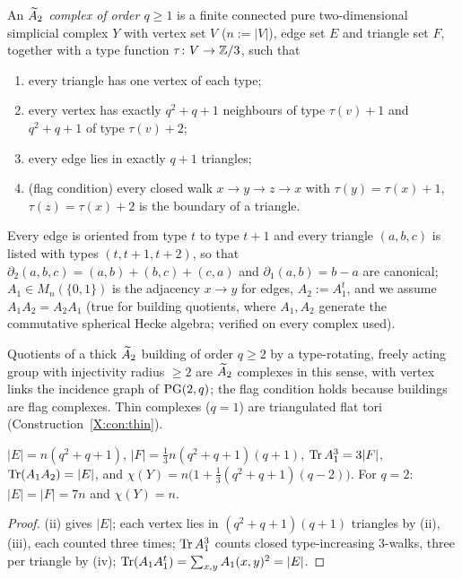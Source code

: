 \begin{definition}\label{X:def:a2}
An \emph{$\widetilde A_2$ complex of order $q\ge1$} is a finite connected pure two-dimensional
simplicial complex $Y$ with vertex set $V$ ($n:=|V|$), edge set $E$ and triangle set $F$,
together with a type function $\tau\colon V\to\mathbb{Z}/3$, such that
\begin{enumerate}
\item[(i)] every triangle has one vertex of each type;
\item[(ii)] every vertex has exactly $q^{2}+q+1$ neighbours of type $\tau(v)+1$ and
$q^{2}+q+1$ of type $\tau(v)+2$;
\item[(iii)] every edge lies in exactly $q+1$ triangles;
\item[(iv)] (flag condition) every closed walk $x\to y\to z\to x$ with
$\tau(y)=\tau(x)+1$, $\tau(z)=\tau(x)+2$ is the boundary of a triangle.
\end{enumerate}
Every edge is oriented from type $t$ to type $t+1$ and every triangle $(a,b,c)$ is listed
with types $(t,t+1,t+2)$, so that $\partial_2(a,b,c)=(a,b)+(b,c)+(c,a)$ and
$\partial_1(a,b)=b-a$ are canonical; $A_1\in M_n(\{0,1\})$ is the adjacency $x\to y$ for
edges, $A_2:=A_1^{t}$, and we assume $A_1A_2=A_2A_1$ (true for building quotients, where
$A_1,A_2$ generate the commutative spherical Hecke algebra; verified on every complex used).
\end{definition}

Quotients of a thick $\widetilde A_2$ building of order $q\ge2$ by a type-rotating, freely acting
group with injectivity radius $\ge2$ are $\widetilde A_2$ complexes in this sense, with vertex links
the incidence graph of $\mathrm{PG}(2,q)$; the flag condition holds because buildings are flag
complexes. Thin complexes ($q=1$) are triangulated flat tori (Construction~\ref{X:con:thin}).

\begin{lemma}[Counts]\label{X:lem:counts}
$|E|=n(q^{2}+q+1)$, $|F|=\tfrac13n(q^{2}+q+1)(q+1)$, $\operatorname{Tr} A_1^{3}=3|F|$,
$\operatorname{Tr}(A_1A_2)=|E|$, and $\chi(Y)=n\bigl(1+\tfrac13(q^{2}+q+1)(q-2)\bigr)$. For $q=2$:
$|E|=|F|=7n$ and $\chi(Y)=n$.
\end{lemma}

\begin{proof}
(ii) gives $|E|$; each vertex lies in $(q^{2}+q+1)(q+1)$ triangles by (ii),(iii), each
counted three times; $\operatorname{Tr} A_1^{3}$ counts closed type-increasing $3$-walks, three per
triangle by (iv); $\operatorname{Tr}(A_1A_1^{t})=\sum_{x,y}A_1(x,y)^{2}=|E|$.
\end{proof}

